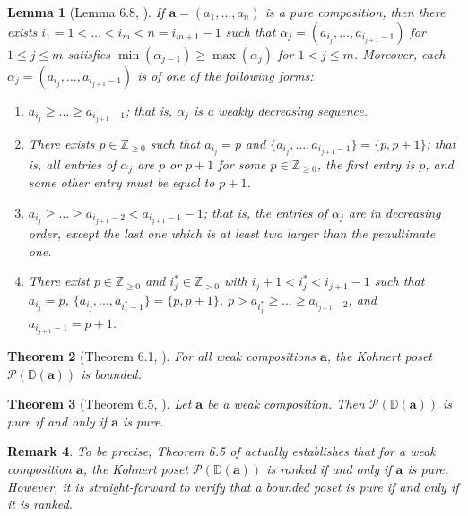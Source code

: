 \documentclass[letterpaper,10pt]{article}
\newtheorem{theorem}{Theorem}
\newtheorem{lemma}[theorem]{Lemma}
\newtheorem{remark}[theorem]{Remark}
\begin{document}
\begin{lemma}[Lemma 6.8, \textbf{\cite{KPoset1}}]\label{lem:puredecomp}
    If $\mathbf{a}=(a_1,\hdots,a_n)$ is a pure composition, then there exists $i_1=1<\hdots<i_{m}<n=i_{m+1}-1$ such that $\alpha_j=(a_{i_j},\hdots,a_{i_{j+1}-1})$ for $1\le j\le m$ satisfies $\min(\alpha_{j-1})\ge \max(\alpha_j)$ for $1<j\le m$. Moreover, each $\alpha_j=(a_{i_j},\hdots,a_{i_{j+1}-1})$ is of one of the following forms:
    \begin{enumerate}
         \item[\textup{(i)}] $a_{i_j}\ge \hdots\ge a_{i_{j+1}-1}$; that is, $\alpha_j$ is a weakly decreasing sequence. 
        \item[\textup{(ii)}] There exists $p\in\mathbb{Z}_{\ge 0}$ such that $a_{i_j}=p$ and $\{a_{i_j},\hdots,a_{i_{j+1}-1}\}=\{p,p+1\}$; that is, all entries of $\alpha_j$ are $p$ or $p+1$ for some $p\in \mathbb{Z}_{\ge 0}$, the first entry is $p$, and some other entry must be equal to $p+1$. 
        \item[\textup{(iii)}] $a_{i_j}\ge\hdots\ge a_{i_{j+1}-2}<a_{i_{j+1}-1}-1$; that is, the entries of $\alpha_j$ are in decreasing order, except the last one which is at least two larger than the penultimate one. 
        \item[\textup{(iv)}] There exist $p\in\mathbb{Z}_{\ge 0}$ and $i_j^*\in\mathbb{Z}_{> 0}$ with $i_j+1<i_j^*<i_{j+1}-1$ such that $a_{i_j}=p$, $\{a_{i_j},\hdots,a_{i_j^*-1}\}=\{p,p+1\}$, $p>a_{i_j^*}\ge \hdots\ge a_{i_{j+1}-2}$, and $a_{i_{j+1}-1}=p+1$.
    \end{enumerate}
\end{lemma}

\begin{theorem}[Theorem 6.1, \textbf{\cite{KPoset1}}]\label{thm:keybound}
    For all weak compositions $\mathbf{a}$, the Kohnert poset $\mathcal{P}(\mathbb{D}(\mathbf{a}))$ is bounded.
\end{theorem}

\begin{theorem}[Theorem 6.5, \textbf{\cite{KPoset1}}]\label{thm:kgrade}
    Let $\mathbf{a}$ be a weak composition. Then $\mathcal{P}(\mathbb{D}(\mathbf{a}))$ is pure if and only if $\mathbf{a}$ is pure.
\end{theorem}

\begin{remark}
    To be precise, Theorem 6.5 of \textup{\textbf{\cite{KPoset1}}} actually establishes that for a weak composition $\mathbf{a}$, the Kohnert poset $\mathcal{P}(\mathbb{D}(\mathbf{a}))$ is ranked if and only if $\mathbf{a}$ is pure. However, it is straight-forward to verify that a bounded poset is pure if and only if it is ranked.
\end{remark}
\end{document}
